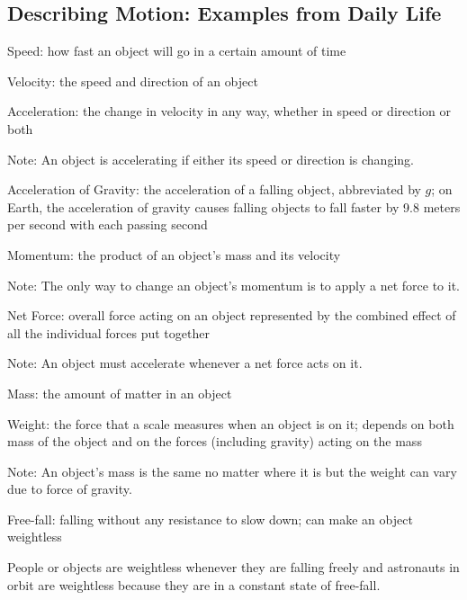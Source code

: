 \documentclass[12pt]{article}
\begin{document}
\subsection{Describing Motion: Examples from Daily Life} 
\begin{definition} Speed: how fast an object will go in a certain amount of time \end{definition} 
\begin{definition} Velocity: the speed and direction of an object \end{definition} 
\begin{definition} Acceleration: the change in velocity in any way, whether in speed or direction or both \end{definition} 
Note: An object is accelerating if either its speed or direction is changing. 
\begin{definition} Acceleration of Gravity: the acceleration of a falling object, abbreviated by $g$; on Earth, the acceleration of gravity causes falling objects to fall faster by 9.8 meters per second with each passing second \end{definition} 
\begin{definition} Momentum: the product of an object's mass and its velocity \end{definition} 
Note: The only way to change an object's momentum is to apply a net force to it. 
\begin{definition} Net Force: overall force acting on an object represented by the combined effect of all the individual forces put together \end{definition} 
Note: An object must accelerate whenever a net force acts on it. 
\begin{definition} Mass: the amount of matter in an object \end{definition} 
\begin{definition} Weight: the force that a scale measures when an object is on it; depends on both mass of the object and on the forces (including gravity) acting on the mass  \end{definition} 
Note: An object's mass is the same no matter where it is but the weight can vary due to force of gravity. 
\begin{definition} Free-fall: falling without any resistance to slow down; can make an object weightless \end{definition} 
People or objects are weightless whenever they are falling freely and astronauts in orbit are weightless because they are in a constant state of free-fall. 
\end{document}
